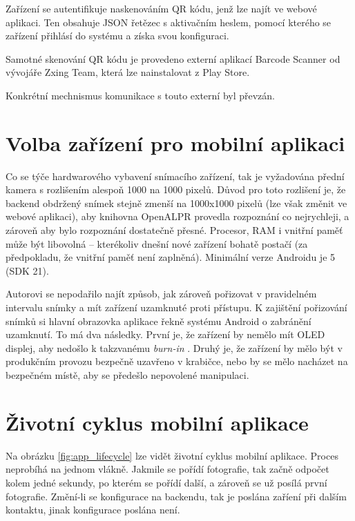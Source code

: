 Zařízení se autentifikuje naskenováním QR kódu, jenž lze najít ve webové aplikaci. Ten obsahuje
JSON řetězec s aktivačním heslem, pomocí kterého se zařízení přihlásí do systému a získa svou konfiguraci.

Samotné skenování QR kódu je provedeno externí aplikací Barcode Scanner od vývojáře
Zxing Team, která lze nainstalovat z Play Store.

Konkrétní mechnismus komunikace s touto externí byl převzán. \citep[viz][]{QrScan}

\section{Volba zařízení pro mobilní aplikaci}

Co se týče hardwarového vybavení snímacího zařízení, tak je vyžadována přední kamera
s rozlišením alespoň 1000 na 1000 pixelů. Důvod pro toto rozlišení je, že backend obdržený snímek
stejně zmenší na 1000x1000 pixelů (lze však změnit ve webové aplikaci), aby knihovna OpenALPR provedla rozpoznání co nejrychleji, a zároveň
aby bylo rozpoznání dostatečně přesné. Procesor, RAM i vnitřní paměť může být libovolná -- kterékoliv
dnešní nové zařízení bohatě postačí (za předpokladu, že vnitřní paměť není zaplněná).
Minimální verze Androidu je 5 (SDK 21).

Autorovi se nepodařilo najít způsob, jak zároveň pořizovat v pravidelném intervalu snímky
a mít zařízení uzamknuté proti přístupu. K zajištění pořizování snímků si hlavní
obrazovka aplikace řekně systému Android o zabránění uzamknutí.
To má dva následky. První je, že zařízení by nemělo mít OLED displej, aby nedošlo k takzvanému
\textit{burn-in} \citep[viz][]{OledBurnIn}. Druhý je, že zařízení by mělo být v produkčním provozu
bezpečně uzavřeno v krabičce, nebo by se mělo nacházet na bezpečném místě, aby se předešlo
nepovolené manipulaci.

\section{Životní cyklus mobilní aplikace}

Na obrázku \ref{fig:app_lifecycle} lze vidět životní cyklus mobilní aplikace.
Proces neprobíhá na jednom vlákně. Jakmile se pořídí fotografie, tak začně odpočet kolem jedné
sekundy, po kterém se pořídí další, a zároveň se už posílá první fotografie.
Změní-li se konfigurace na backendu, tak je poslána zaříení při dalším kontaktu, jinak
konfigurace poslána není.

